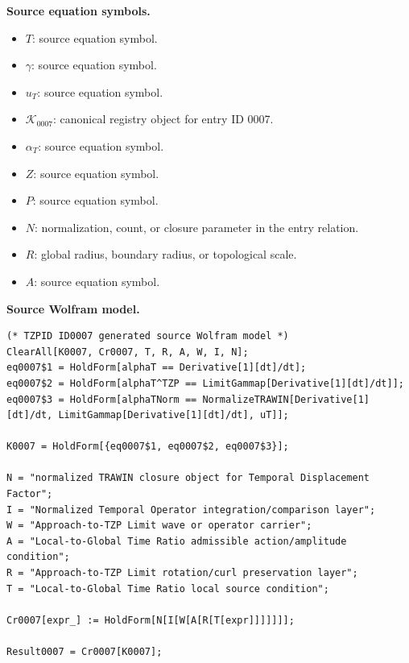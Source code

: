 \begin{minipage}[t]{0.49\linewidth}
\begingroup
\small
\raggedright
\textbf{Source equation symbols.}\par
\begin{itemize}[leftmargin=1.35em,itemsep=1pt,topsep=1pt,parsep=0pt]
    \item $T$: source equation symbol.
    \item $\gamma$: source equation symbol.
    \item $u_{T}$: source equation symbol.
    \item $\mathcal{K}_{0007}$: canonical registry object for entry ID 0007.
    \item $\alpha_{T}$: source equation symbol.
    \item $Z$: source equation symbol.
    \item $P$: source equation symbol.
    \item $N$: normalization, count, or closure parameter in the entry relation.
    \item $R$: global radius, boundary radius, or topological scale.
    \item $A$: source equation symbol.
\end{itemize}
\endgroup
\end{minipage}\hfill
\begin{minipage}[t]{0.47\linewidth}
\begingroup
\scriptsize
\raggedright
\textbf{Source Wolfram model.}\par
\begin{Verbatim}[fontsize=\tiny,breaklines=true,breakanywhere=true]
(* TZPID ID0007 generated source Wolfram model *)
ClearAll[K0007, Cr0007, T, R, A, W, I, N];
eq0007$1 = HoldForm[alphaT == Derivative[1][dt]/dt];
eq0007$2 = HoldForm[alphaT^TZP == LimitGammap[Derivative[1][dt]/dt]];
eq0007$3 = HoldForm[alphaTNorm == NormalizeTRAWIN[Derivative[1][dt]/dt, LimitGammap[Derivative[1][dt]/dt], uT]];

K0007 = HoldForm[{eq0007$1, eq0007$2, eq0007$3}];

N = "normalized TRAWIN closure object for Temporal Displacement Factor";
I = "Normalized Temporal Operator integration/comparison layer";
W = "Approach-to-TZP Limit wave or operator carrier";
A = "Local-to-Global Time Ratio admissible action/amplitude condition";
R = "Approach-to-TZP Limit rotation/curl preservation layer";
T = "Local-to-Global Time Ratio local source condition";

Cr0007[expr_] := HoldForm[N[I[W[A[R[T[expr]]]]]]];

Result0007 = Cr0007[K0007];
\end{Verbatim}
\endgroup
\end{minipage}

